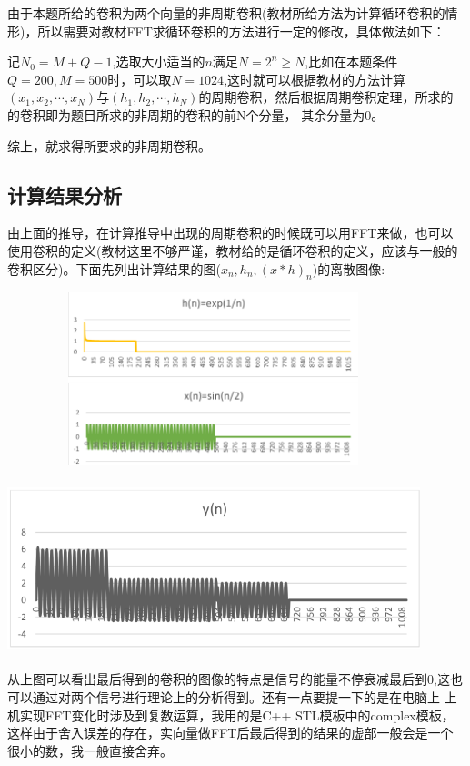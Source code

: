 \documentclass[10pt,a4paper]{ctexart}
\begin{document}
由于本题所给的卷积为两个向量的非周期卷积(教材所给方法为计算循环卷积的情形)，所以需要对教材FFT求循环卷积的方法进行一定的修改，具体做法如下：

记$N_0=M+Q-1$,选取大小适当的$n$满足$N=2^n\geq N$,比如在本题条件$Q=200,M=500$时，可以取$N=1024$,这时就可以根据教材的方法计算
$(x_1,x_2,\cdots,x_N)$与$(h_1,h_2,\cdots,h_N)$的周期卷积，然后根据周期卷积定理，所求的的卷积即为题目所求的非周期的卷积的前N个分量，
其余分量为0。

综上，就求得所要求的非周期卷积。
\subsection{计算结果分析}

由上面的推导，在计算推导中出现的周期卷积的时候既可以用FFT来做，也可以使用卷积的定义(教材这里不够严谨，教材给的是循环卷积的定义，应该与一般的卷积区分)。下面先列出计算结果的图($x_n,h_n,(x*h)_n$)的离散图像:
\par
\centerline{\includegraphics[height=5cm,width=12cm]{5.2.png}}
\par
\par
\centerline{\includegraphics[height=5cm,width=12cm]{5.21.png}}
\par
从上图可以看出最后得到的卷积的图像的特点是信号的能量不停衰减最后到0,这也可以通过对两个信号进行理论上的分析得到。还有一点要提一下的是在电脑上
上机实现FFT变化时涉及到复数运算，我用的是C++ STL模板中的complex模板，这样由于舍入误差的存在，实向量做FFT后最后得到的结果的虚部一般会是一个很小的数，我一般直接舍弃。
\end{document}
